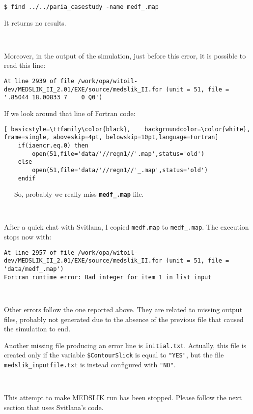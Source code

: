 \begin{lstlisting}
$ find ../../paria_casestudy -name medf_.map
\end{lstlisting}

It returns no results.

\

Moreover, in the output of the simulation, just before this error, it is possible to read this line:

\begin{lstlisting}
At line 2939 of file /work/opa/witoil-dev/MEDSLIK_II_2.01/EXE/source/medslik_II.for (unit = 51, file = '.85044 18.00833 7    0 Q0')
\end{lstlisting}

If we look around that line of Fortran code:

\begin{lstlisting}[ basicstyle=\ttfamily\color{black},    backgroundcolor=\color{white}, frame=single, aboveskip=4pt, belowskip=10pt,language=Fortran]
    if(iaencr.eq.0) then
        open(51,file='data/'//regn1//'.map',status='old')
    else
	    open(51,file='data/'//regn1//'_.map',status='old')
	endif 
\end{lstlisting}

\faWarning\ \faWarning\ \faWarning\ So, probably we really miss \texttt{\textbf{medf\_.map}} file.

\ 

After a quick chat with Svitlana, I copied \texttt{medf.map} to \texttt{medf\_.map}. The execution stops now with:

\begin{lstlisting}
At line 2957 of file /work/opa/witoil-dev/MEDSLIK_II_2.01/EXE/source/medslik_II.for (unit = 51, file = 'data/medf_.map')
Fortran runtime error: Bad integer for item 1 in list input
\end{lstlisting}

\

Other errors follow the one reported above. They are related to missing output files, probably not generated due to the absence of the previous file that caused the simulation to end.

Another missing file producing an error line is \texttt{initial.txt}. Actually, this file is created only if the variable \texttt{\$ContourSlick} is equal to \texttt{"YES"}, but the file \texttt{medslik\_inputfile.txt} is instead configured with \texttt{"NO"}.

\ 

This attempt to make MEDSLIK run has been stopped. Please follow the next section that uses Svitlana's code.

